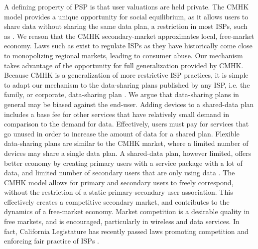 \documentclass[sigconf, anonymous]{acmart}
\theoremstyle{definition}
\begin{document}
A defining property of PSP is that user valuations are held private. 
The CMHK model provides a unique opportunity for social equilibrium, as it
allows users to share data without sharing the same data plan, a restriction in
most ISPs, such as \cite{att}. We reason that the CMHK secondary-market
approximates local, free-market economy. Laws such as \cite{fedbill} exist to regulate ISPs
as they have historically come close to monopolizing regional markets, leading
to consumer abuse. Our mechanism
takes advantage of the opportunity for full generalization provided by CMHK.
Because CMHK is a generalization of more restrictive ISP practices, it is simple
to adapt our mechanism to the data-sharing
plans published by any ISP, i.e. the family, or corporate, data-sharing plan
\cite{att}.
We argue that data-sharing plans in general may be
biased against the end-user. Adding devices to a shared-data plan includes a
base fee for other services that have relatively small demand in comparison to
the demand for data. Effectively, users must pay for services that go unused in
order to increase the amount of data for a shared plan. Flexible data-sharing
plans are similar to the CMHK market, where a limited number of devices may
share a single data plan. A shared-data plan, however limited, offers better economy
by creating primary users with a service package with a lot of data, and
limited number of secondary users that are only using data \cite{att}.
The CMHK model allows for primary and secondary users to freely correspond,
without the restriction of a static primary-secondary user association.
This effectively creates a competitive secondary market, and contributes to the
dynamics of a free-market economy. Market competition is a desirable quality in
free markets, and is encouraged, particularly in wireless and data services. In
fact, California Legistature has recently passed laws promoting
competition and enforcing fair practice of ISPs \cite{cabill}.
\end{document}
